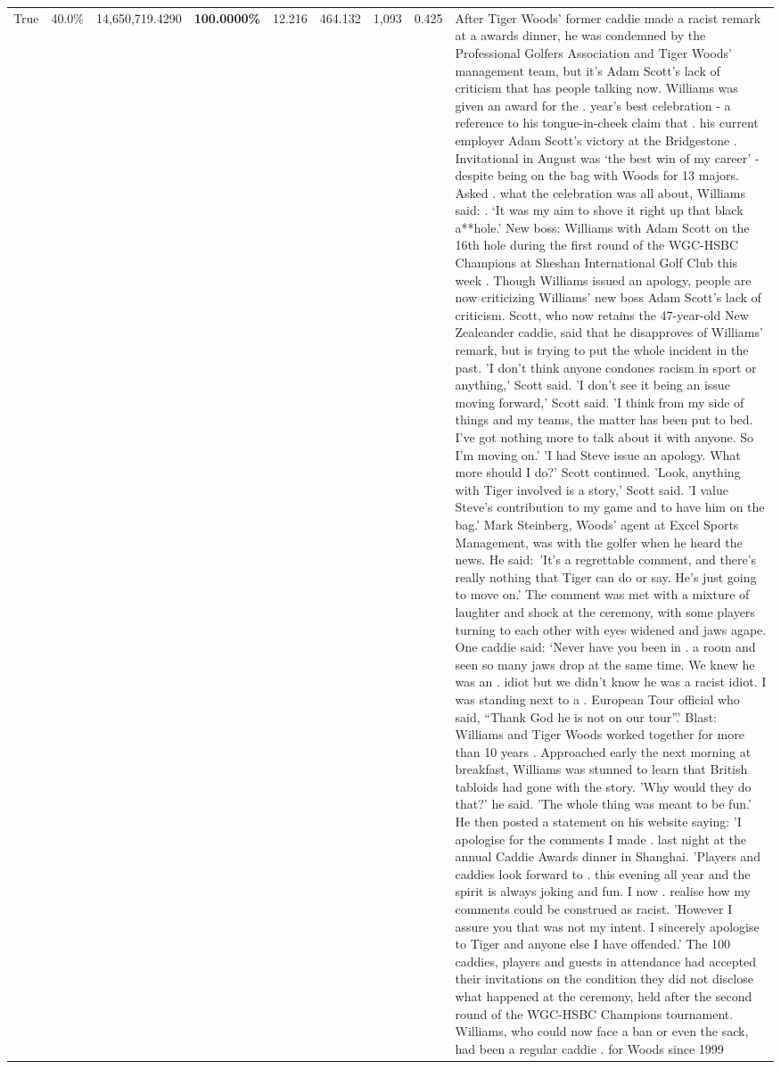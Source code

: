 \begin{table}[H]
\begin{tabular}{lllrlllll}
True & 40.0\% & 14,650,719.4290 & \bfseries \color{red} 100.0000\% & 12.216 & 464.132 & 1,093 & 0.425 & After Tiger Woods' former caddie made a racist remark at a awards dinner, he was condemned by the Professional Golfers Association and Tiger Woods' management team, but it's Adam Scott's lack of criticism that has people talking now. Williams was given an award for the . year’s best celebration - a reference to his tongue-in-cheek claim that . his current employer Adam Scott’s victory at the Bridgestone . Invitational in August was ‘the best win of my career’ - despite being on the bag with Woods for 13 majors. Asked . what the celebration was all about, Williams said: . ‘It was my aim to shove it right up that black a**hole.’ New boss: Williams with Adam Scott  on the 16th hole during the first round of the WGC-HSBC Champions at Sheshan International Golf Club this week . Though Williams issued an apology, people are now criticizing Williams' new boss Adam Scott's lack of criticism. Scott, who now retains the 47-year-old New Zealeander caddie, said that he disapproves of Williams' remark, but is trying to put the whole incident in the past. 'I don't think anyone condones racism in sport or anything,' Scott said. 'I don't see it being an issue moving forward,' Scott said. 'I think from my side of things and my teams, the matter has been put to bed. I've got nothing more to talk about it with anyone. So I'm moving on.' 'I had Steve issue an apology. What more should I do?' Scott continued. 'Look, anything with Tiger involved is a story,' Scott said. 'I value Steve's contribution to my game and to have him on the bag.' Mark Steinberg, Woods' agent at Excel Sports Management, was with the golfer when he heard the news. He said: 'It's a regrettable comment, and there's really nothing that Tiger can do or say. He's just going to move on.' The comment was met with a mixture of laughter and shock at the ceremony, with some players turning to each other with eyes widened and jaws agape. One caddie said: ‘Never have you been in . a room and seen so many jaws drop at the same time. We knew he was an . idiot but we didn’t know he was a racist idiot. I was standing next to a . European Tour official who said, “Thank God he is not on our tour”.’ Blast: Williams and Tiger Woods worked together for more than 10 years . Approached early the next morning at breakfast, Williams was stunned to learn that British tabloids had gone with the story. 'Why would they do that?' he said. 'The whole thing was meant to be fun.' He then posted a statement on his website saying: 'I apologise for the comments I made . last night at the annual Caddie Awards dinner in Shanghai. 'Players and caddies look forward to . this evening all year and the spirit is always joking and fun. I now . realise how my comments could be construed as racist. 'However I assure you that was not my intent. I sincerely apologise to Tiger and anyone else I have offended.' The 100 caddies, players and guests in attendance had accepted their invitations on the condition they did not disclose what happened at the ceremony, held after the second round of the WGC-HSBC Champions tournament. Williams, who could now face a ban or even the sack, had been a regular caddie . for Woods since 1999 
\end{tabular}
\end{table}
